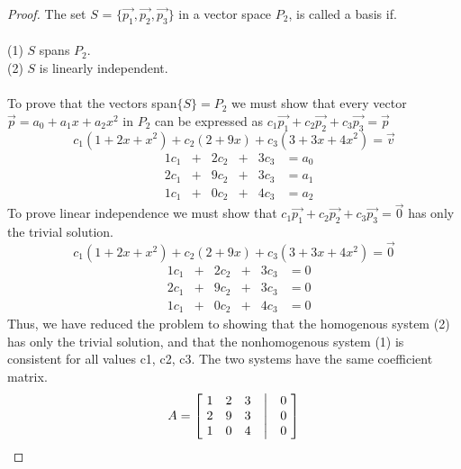 \documentclass[../main.tex]{subfiles}
\begin{document}
\begin{proof}
  The set $S$ = $\{\vec{p_{1}}, \vec{p_{2}}, \vec{p_{3}}\}$ in a vector space $P_2$, is called a basis if. \\\\
  (1) $S$ spans $P_2$.\\
  (2) $S$ is linearly independent.\\\\
  To prove that the vectors span$\{S\}=P_2$ we must show that
  every vector $\vec{p} = a_{0} + a_{1}x + a_{2}x^{2}$ in $P_2$
  can be expressed as $c_{1}\vec{p_{1}} + c_{2}\vec{p_{2}} + c_{3}\vec{p_{3}} = \vec{p}$\\
  \begin{equation}
    c_{1}(1+2x+x^2) + c_{2}(2 + 9x) + c_{3}(3 + 3x + 4x^2) = \vec{v}
  \end{equation}
  $$
    \begin{matrix}
       & 1c_{1} & + & 2c_{2} & + & 3c_{3} & = a_{0} \\
       & 2c_{1} & + & 9c_{2} & + & 3c_{3} & = a_{1} \\
       & 1c_{1} & + & 0c_{2} & + & 4c_{3} & = a_{2}
    \end{matrix}
  $$
  To prove linear independence we must show that $c_{1}\vec{p_{1}} + c_{2}\vec{p_{2}} + c_{3}\vec{p_{3}} = \vec{0}$
  has only the trivial solution.\\
  \begin{equation}
    c_{1}(1+2x+x^2) + c_{2}(2 + 9x) + c_{3}(3 + 3x + 4x^2) = \vec{0}
  \end{equation}
  $$
    \begin{matrix}
       & 1c_{1} & + & 2c_{2} & + & 3c_{3} & = 0 \\
       & 2c_{1} & + & 9c_{2} & + & 3c_{3} & = 0 \\
       & 1c_{1} & + & 0c_{2} & + & 4c_{3} & = 0
    \end{matrix}
  $$
  Thus, we have reduced the problem to showing that the homogenous system (2) has only the trivial solution, and that the nonhomogenous system (1) is consistent for all values c1, c2, c3.
  The two systems have the same coefficient matrix.
  \begin{align*}
    A = \begin{bmatrix}
      \ 1 & 2 & 3 & \bigm| & 0\ \\
      \ 2 & 9 & 3 & \bigm| & 0\ \\
      \ 1 & 0 & 4 & \bigm| & 0\
    \end{bmatrix}
  \end{align*}

\end{proof}
\end{document}
